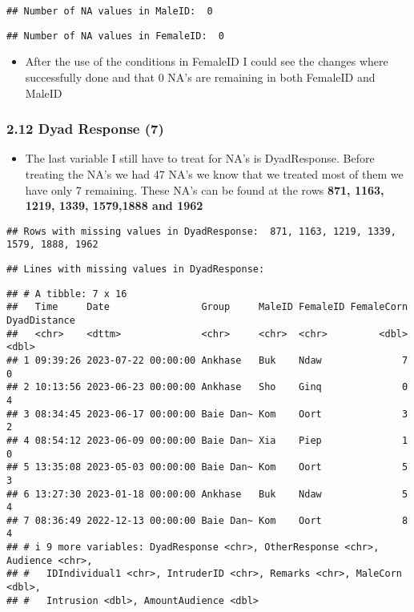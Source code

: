 \documentclass[
]{article}
\providecommand{\tightlist}{%
  \setlength{\itemsep}{0pt}\setlength{\parskip}{0pt}}
\begin{document}
\begin{verbatim}
## Number of NA values in MaleID:  0
\end{verbatim}

\begin{verbatim}
## Number of NA values in FemaleID:  0
\end{verbatim}

\begin{itemize}
\tightlist
\item
  After the use of the conditions in FemaleID I could see the changes
  where successfully done and that 0 NA's are remaining in both FemaleID
  and MaleID
\end{itemize}

\hypertarget{dyad-response-7}{%
\subsubsection{2.12 Dyad Response (7)}\label{dyad-response-7}}

\begin{itemize}
\tightlist
\item
  The last variable I still have to treat for NA's is DyadResponse.
  Before treating the NA's we had 47 NA's we know that we treated most
  of them we have only 7 remaining. These NA's can be found at the rows
  \textbf{871, 1163, 1219, 1339, 1579,1888 and 1962}
\end{itemize}

\begin{verbatim}
## Rows with missing values in DyadResponse:  871, 1163, 1219, 1339, 1579, 1888, 1962
\end{verbatim}

\begin{verbatim}
## Lines with missing values in DyadResponse:
\end{verbatim}

\begin{verbatim}
## # A tibble: 7 x 16
##   Time     Date                Group     MaleID FemaleID FemaleCorn DyadDistance
##   <chr>    <dttm>              <chr>     <chr>  <chr>         <dbl>        <dbl>
## 1 09:39:26 2023-07-22 00:00:00 Ankhase   Buk    Ndaw              7            0
## 2 10:13:56 2023-06-23 00:00:00 Ankhase   Sho    Ginq              0            4
## 3 08:34:45 2023-06-17 00:00:00 Baie Dan~ Kom    Oort              3            2
## 4 08:54:12 2023-06-09 00:00:00 Baie Dan~ Xia    Piep              1            0
## 5 13:35:08 2023-05-03 00:00:00 Baie Dan~ Kom    Oort              5            3
## 6 13:27:30 2023-01-18 00:00:00 Ankhase   Buk    Ndaw              5            4
## 7 08:36:49 2022-12-13 00:00:00 Baie Dan~ Kom    Oort              8            4
## # i 9 more variables: DyadResponse <chr>, OtherResponse <chr>, Audience <chr>,
## #   IDIndividual1 <chr>, IntruderID <chr>, Remarks <chr>, MaleCorn <dbl>,
## #   Intrusion <dbl>, AmountAudience <dbl>
\end{verbatim}
\end{document}
